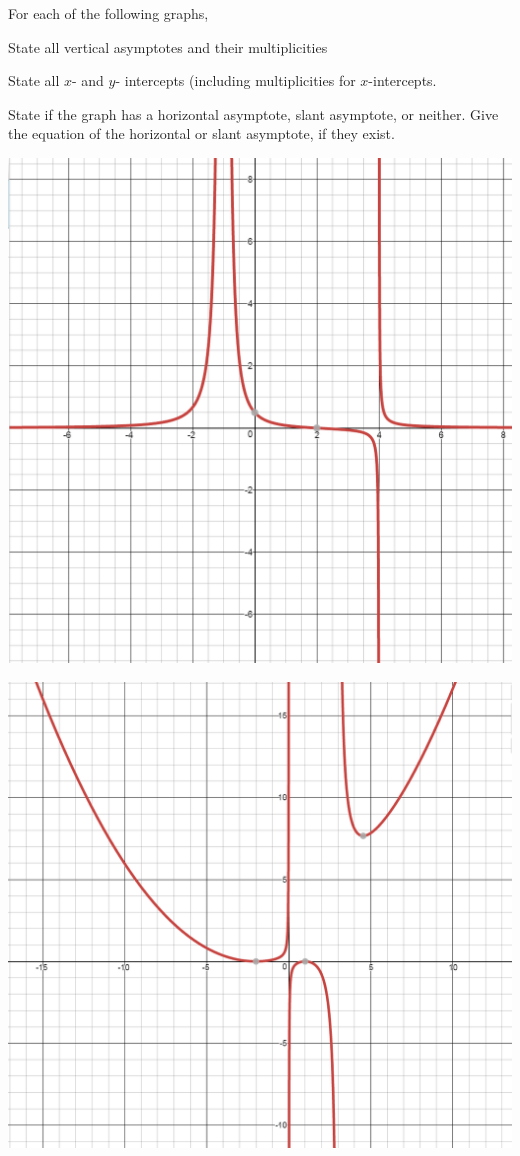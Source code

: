 \bq For each of the following graphs,
\be
\item State all vertical asymptotes and their multiplicities
\item State all $x$- and $y$- intercepts (including multiplicities for $x$-intercepts.
\item State if the graph has a horizontal asymptote, slant asymptote, or neither. Give the equation of the horizontal or slant asymptote, if they exist.
\ee
\begin{center} \includegraphics[scale=.45]{r3.png}

\includegraphics[scale=.40]{r4.png}


\end{center}
